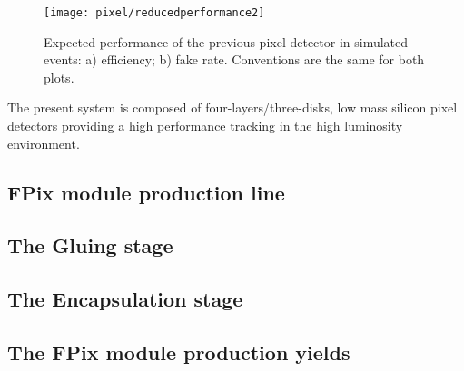 \begin{figure}[!h]
\centering
\texttt{[image: pixel/reducedperformance2]}
\caption {Expected performance of the previous pixel detector in simulated \ttbar events: a) efficiency; b) fake rate. Conventions are the same for both plots.}\label{tdr}
\label{fig:reduced_performance}
\end{figure}

The present system is composed of four-layers/three-disks, low mass silicon pixel detectors providing a high performance tracking in the high luminosity environment.






\subsection{FPix module production line}





\subsection{The Gluing stage}



\subsection{The Encapsulation stage}


\subsection{The FPix module production yields}


